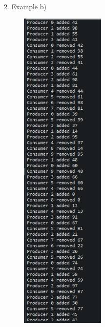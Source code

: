\documentclass[14pt]{article}
\begin{document}
\begin{center}
2. Example b)\\
\vspace{10mm}

\includegraphics[height=6.5in, width = 2.5in]{fine1.png}\\
\end{center}
\end{document}
